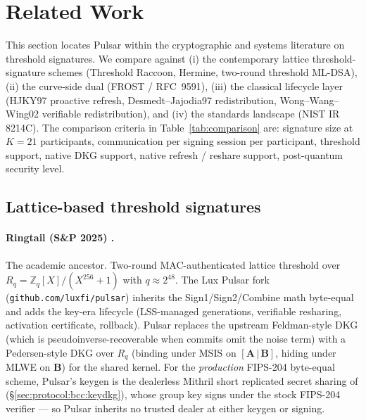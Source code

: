 \section{Related Work}
\label{sec:related}

This section locates Pulsar within the cryptographic and systems
literature on threshold signatures. We compare against (i) the
contemporary lattice threshold-signature schemes (Threshold Raccoon,
Hermine, two-round threshold ML-DSA), (ii) the curve-side dual
(FROST / RFC~9591), (iii) the classical lifecycle layer
(HJKY97 proactive refresh, Desmedt--Jajodia97 redistribution,
Wong--Wang--Wing02 verifiable redistribution), and (iv) the standards
landscape (NIST IR 8214C). The comparison criteria in
Table~\ref{tab:comparison} are: signature size at $K = 21$
participants, communication per signing session per participant,
threshold support, native DKG support, native refresh / reshare
support, post-quantum security level.

\subsection{Lattice-based threshold signatures}
\label{sec:related:lattice}

\paragraph{Ringtail (S\&P 2025) \cite{ringtail}.} The academic
ancestor. Two-round MAC-authenticated lattice threshold over
$R_q = \mathbb{Z}_q[X]/(X^{256}+1)$ with $q \approx 2^{48}$. The Lux
Pulsar fork (\texttt{github.com/luxfi/pulsar}) inherits the
Sign1/Sign2/Combine math byte-equal and adds the key-era lifecycle
(LSS-managed generations, verifiable resharing, activation
certificate, rollback). Pulsar replaces the upstream Feldman-style
DKG (which is pseudoinverse-recoverable when commits omit the noise
term) with a Pedersen-style DKG over $R_q$ (binding under MSIS on
$[\mathbf{A}\,|\,\mathbf{B}]$, hiding under MLWE on $\mathbf{B}$) for the
shared kernel. For the \emph{production} FIPS-204 byte-equal scheme,
Pulsar's keygen is the dealerless Mithril short replicated secret sharing
of \cite{mithril2026} (\S\ref{sec:protocol:bcc:keydkg}), whose group key
signs under the stock FIPS-204 verifier --- so Pulsar inherits no
trusted dealer at either keygen or signing.

